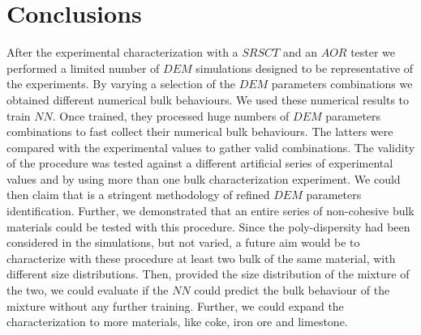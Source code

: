 \section{Conclusions}
\label{sec:conclusions}
After the experimental characterization with a $SRSCT$ and an $AOR$ tester we performed a 
limited number of $DEM$ simulations designed to be representative of the experiments. 
By varying a selection of the $DEM$ parameters combinations we obtained different numerical bulk behaviours. 
We used these numerical results to train $NN$. Once trained, they processed huge 
numbers of $DEM$ parameters combinations to fast collect their numerical bulk behaviours. 
The latters were compared with the experimental values to gather valid combinations. 
The validity of the procedure was tested against a different artificial series of experimental 
values and by using more than one bulk characterization experiment. 
We could then claim that is a stringent methodology of refined $DEM$ parameters identification. 
Further, we demonstrated that an entire series of non-cohesive bulk materials could be tested with this procedure.
Since the poly-dispersity had been considered in the simulations, but not varied, a future aim would 
be to characterize with these procedure at least two bulk of the same material, with different size distributions. 
Then, provided the size distribution of the mixture of the two, we could evaluate if the $NN$ could predict 
the bulk behaviour of the mixture without any further training. 
Further, we could expand the characterization to more materials, like coke, iron ore and limestone.
